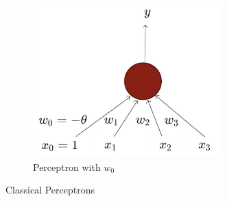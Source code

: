 \documentclass[a4paper]{article}
\begin{document}
\begin{itemize}
\begin{figure}[H]
\begin{subfigure}[b]{0.45\textwidth}
        \end{subfigure}
        \hfill
        \begin{subfigure}[b]{0.45\textwidth}
            \includegraphics[width=0.8\textwidth]{Degree/static/DL_perceptron_bias.png}
            \caption{Perceptron with $w_0$}
            \label{fig:DL-perceptron-bias}
        \end{subfigure}
        \caption{Classical Perceptrons}
        \label{fig:DL-classical-perceptrons}
    \end{figure}
\end{itemize}
\end{document}
